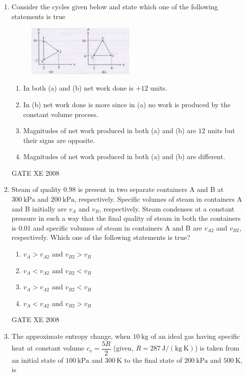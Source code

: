 \documentclass[12pt]{article}
\begin{document}
\begin{enumerate}
\item Consider the cycles given below and state which one of the following statements is true

    \begin{figure}[H]
    \centering
    \includegraphics[width=0.5\textwidth]{figs/ass1_g_q13.png}
    \caption{}
    \end{figure}

\begin{enumerate}
\item  In both (a) and (b) net work done is $+12$ units.
\item  In (b) net work done is more since in (a) no work is produced by the constant volume process.
\item  Magnitudes of net work produced in both (a) and (b) are $12$ units but their signs are opposite.
\item  Magnitudes of net work produced in both (a) and (b) are different.  
\end{enumerate}

GATE XE 2008

\item Steam of quality $0.98$ is present in two separate containers A and B at $300\ \mathrm{kPa}$ and $200\ \mathrm{kPa}$, respectively. Specific volumes of steam in containers A and B initially are $v_A$ and $v_B$, respectively. Steam condenses at a constant pressure in such a way that the final quality of steam in both the containers is $0.01$ and specific volumes of steam in containers A and B are $v_{A2}$ and $v_{B2}$, respectively. Which one of the following statements is true?  

\begin{enumerate}
\item  $v_A > v_{A2}$ and $v_{B2} > v_B$  
\item  $v_A < v_{A2}$ and $v_{B2} < v_B$  
\item  $v_A > v_{A2}$ and $v_{B2} < v_B$  
\item  $v_A < v_{A2}$ and $v_{B2} > v_B$  
\end{enumerate}

GATE XE 2008

\item The approximate entropy change, when $10\ \mathrm{kg}$ of an ideal gas having specific heat at constant volume $c_v = \dfrac{5R}{2}$ (given, $R = 287\ \mathrm{J/(kg\ K)}$) is taken from an initial state of $100\ \mathrm{kPa}$ and $300\ \mathrm{K}$ to the final state of $200\ \mathrm{kPa}$ and $500\ \mathrm{K}$, is  


\end{enumerate}
\end{document}
